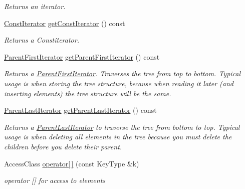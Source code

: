 \begin{DoxyCompactItemize}
\begin{DoxyCompactList}\small\item\em Returns an iterator. \end{DoxyCompactList}\item 
\mbox{\label{classirr_1_1core_1_1map_ad187f7170dd13dfa6d182b478c92942a}} 
\hyperlink{classirr_1_1core_1_1map_1_1ConstIterator}{Const\+Iterator} \hyperlink{classirr_1_1core_1_1map_ad187f7170dd13dfa6d182b478c92942a}{get\+Const\+Iterator} () const
\begin{DoxyCompactList}\small\item\em Returns a Constiterator. \end{DoxyCompactList}\item 
\mbox{\label{classirr_1_1core_1_1map_a3c55db71cb9dca4272fd8f99e5a045de}} 
\hyperlink{classirr_1_1core_1_1map_1_1ParentFirstIterator}{Parent\+First\+Iterator} \hyperlink{classirr_1_1core_1_1map_a3c55db71cb9dca4272fd8f99e5a045de}{get\+Parent\+First\+Iterator} () const
\begin{DoxyCompactList}\small\item\em Returns a \hyperlink{classirr_1_1core_1_1map_1_1ParentFirstIterator}{Parent\+First\+Iterator}. Traverses the tree from top to bottom. Typical usage is when storing the tree structure, because when reading it later (and inserting elements) the tree structure will be the same. \end{DoxyCompactList}\item 
\mbox{\label{classirr_1_1core_1_1map_a36bb25e9cf8b1d13cd0b5cc2301e1130}} 
\hyperlink{classirr_1_1core_1_1map_1_1ParentLastIterator}{Parent\+Last\+Iterator} \hyperlink{classirr_1_1core_1_1map_a36bb25e9cf8b1d13cd0b5cc2301e1130}{get\+Parent\+Last\+Iterator} () const
\begin{DoxyCompactList}\small\item\em Returns a \hyperlink{classirr_1_1core_1_1map_1_1ParentLastIterator}{Parent\+Last\+Iterator} to traverse the tree from bottom to top. Typical usage is when deleting all elements in the tree because you must delete the children before you delete their parent. \end{DoxyCompactList}\item 
Access\+Class \hyperlink{classirr_1_1core_1_1map_a396b601a40d70eb34aa6571e29f55992}{operator\mbox{[}$\,$\mbox{]}} (const Key\+Type \&k)
\begin{DoxyCompactList}\small\item\em operator \mbox{[}\mbox{]} for access to elements \end{DoxyCompactList}\end{DoxyCompactItemize}


